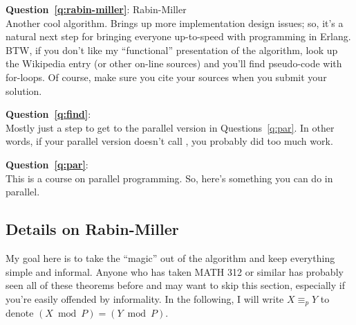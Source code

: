 \documentclass{article}
\newcommand{\equivp}{\equiv_p}
\begin{document}
\begin{description}
    \item{\textbf{Question~\ref{q:rabin-miller}}}: Rabin-Miller\\
      Another cool algorithm.  
      Brings up more implementation design issues; so, it's a natural next step for bringing everyone
      up-to-speed with programming in Erlang.  BTW, if you don't like my ``functional'' presentation of
      the algorithm, look up the Wikipedia entry (or other on-line sources) and you'll find pseudo-code
      with for-loops.  Of course, make sure you cite your sources when you submit your solution.

    \item{\textbf{Question~\ref{q:find}}}: \\
      Mostly just a step to get to the parallel version in Questions~\ref{q:par}.
      In other words, if your parallel version doesn't call ,
      you probably did too much work.

    \item{\textbf{Question~\ref{q:par}}}: \\
      This is a course on parallel programming.  So, here's something you can do in parallel.

  \end{description}

\subsection{Details on Rabin-Miller}\label{sec:numb}
  My goal here is to take the ``magic'' out of the algorithm and keep everything simple and informal.
  Anyone who has taken MATH 312 or similar has probably seen all of these theorems before and may
  want to skip this section, especially if you're easily offended by informality.
  In the following, I will write $X \equivp Y$ to denote $(X \bmod P) = (Y \bmod P)$.
\end{document}
